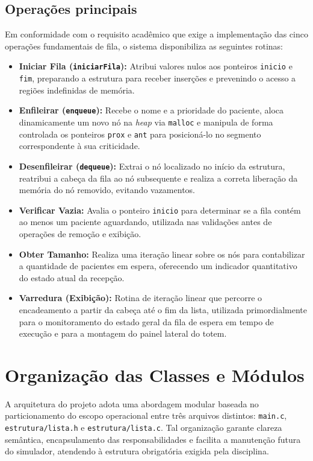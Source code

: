 \documentclass[12pt,a4paper]{article}
\begin{document}
\subsection{Operações principais}
Em conformidade com o requisito acadêmico que exige a implementação das cinco operações fundamentais de fila, o sistema disponibiliza as seguintes rotinas:
\begin{itemize}
    \item \textbf{Iniciar Fila (\texttt{iniciarFila}):} Atribui valores nulos aos ponteiros \texttt{inicio} e \texttt{fim}, preparando a estrutura para receber inserções e prevenindo o acesso a regiões indefinidas de memória.
    \item \textbf{Enfileirar (\texttt{enqueue}):} Recebe o nome e a prioridade do paciente, aloca dinamicamente um novo nó na \textit{heap} via \texttt{malloc} e manipula de forma controlada os ponteiros \texttt{prox} e \texttt{ant} para posicioná-lo no segmento correspondente à sua criticidade.
    \item \textbf{Desenfileirar (\texttt{dequeue}):} Extrai o nó localizado no início da estrutura, reatribui a cabeça da fila ao nó subsequente e realiza a correta liberação da memória do nó removido, evitando vazamentos.
    \item \textbf{Verificar Vazia:} Avalia o ponteiro \texttt{inicio} para determinar se a fila contém ao menos um paciente aguardando, utilizada nas validações antes de operações de remoção e exibição.
    \item \textbf{Obter Tamanho:} Realiza uma iteração linear sobre os nós para contabilizar a quantidade de pacientes em espera, oferecendo um indicador quantitativo do estado atual da recepção.
    \item \textbf{Varredura (Exibição):} Rotina de iteração linear que percorre o encadeamento a partir da cabeça até o fim da lista, utilizada primordialmente para o monitoramento do estado geral da fila de espera em tempo de execução e para a montagem do painel lateral do totem.
\end{itemize}


\section{Organização das Classes e Módulos}
\label{sec:organizacao_classes}
A arquitetura do projeto adota uma abordagem modular baseada no particionamento do escopo operacional entre três arquivos distintos: \texttt{main.c}, \texttt{estrutura/lista.h} e \texttt{estrutura/lista.c}. Tal organização garante clareza semântica, encapsulamento das responsabilidades e facilita a manutenção futura do simulador, atendendo à estrutura obrigatória exigida pela disciplina.
\end{document}
